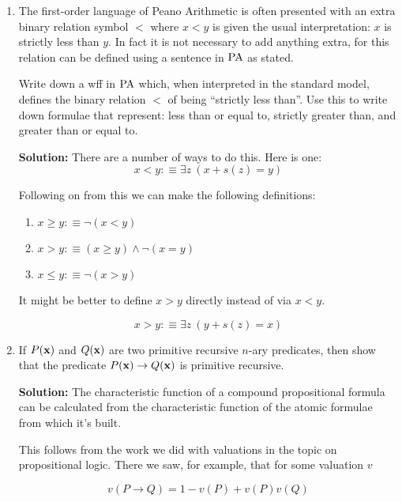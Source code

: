 \documentclass[11pt]{report}
\begin{document}
\begin{enumerate}

	\item The first-order language of Peano Arithmetic is often presented with an extra binary relation symbol $<$ where $x < y$ is given the usual interpretation: $x$ is strictly less than $y$. In fact it is not necessary to add anything extra, for this relation can be defined using a sentence in $\text{PA}$ as stated. 
	
	Write down a wff in $\text{PA}$ which, when interpreted in the standard model, defines the binary relation $<$ of being ``strictly less than''. Use this to write down formulae that represent: less than or equal to, strictly greater than, and greater than or equal to. 

	{\bf Solution:} There are a number of ways to do this. Here is one: $$ x < y :\equiv \exists z \ (x + s(z) = y) $$

	Following on from this we can make the following definitions: 

		\begin{enumerate}
			\item $x \geq y :\equiv \lnot (x < y)$
			\item $x > y :\equiv (x \geq y) \land \lnot(x = y)$
			\item $x \leq y :\equiv \lnot (x > y)$
		\end{enumerate}

	It might be better to define $x > y$ directly instead of via $x < y$. 

	$$ x > y :\equiv \exists z \ (y + s(z) = x) $$

	\item If $P({\bf x})$ and $Q({\bf x})$ are two primitive recursive $n$-ary predicates, then show that the predicate $P({\bf x})\to Q({\bf x})$ is primitive recursive. 
	
	{\bf Solution:} The characteristic function of a compound propositional formula can be calculated from the characteristic function of the atomic formulae from which it's built. 

	This follows from the work we did with valuations in the topic on propositional logic. There we saw, for example, that for some valuation $v$

	$$v(P \rightarrow Q) = 1 - v(P) + v(P)v(Q)$$


\end{enumerate}
\end{document}
